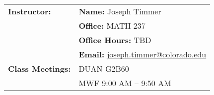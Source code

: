 \documentclass[11pt]{article}
\makeatletter
\newcommand{\TheInstructor}{Joseph Timmer}
\newcommand{\TheOffice}{MATH 237}
\newcommand{\TheOfficeHours}{TBD}
\newcommand{\TheEmail}{joseph.timmer@colorado.edu}
\newcommand{\TheLocation}{DUAN G2B60}
\newcommand{\TheTime}{9:00 AM -- 9:50 AM}
\makeatother
\begin{document}
\begin{longtable}{lp{5.2in}}
%
\textbf{Instructor:}
  & {\bf Name:}   \hspace{8.00ex} \TheInstructor
  \\
  & {\bf Office:}  \hspace{8.25ex} \TheOffice
  \\
  & {\bf Office Hours:} \hspace{.20ex} \TheOfficeHours
  \\
  & {\bf Email:}  \hspace{8.00ex} \href{mailto:\TheEmail}{\TheEmail}
  \\[6pt]
%

\textbf{Class Meetings:}
  & \TheLocation
  \\
  & MWF \TheTime 
 \\[6pt]


\end{longtable}
\end{document}
